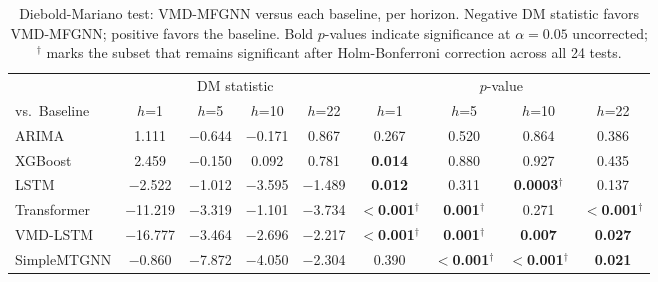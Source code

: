 \documentclass[journal]{IEEEtran}
\begin{document}
\begin{table}[!t]
\centering
\caption{Diebold-Mariano test: VMD-MFGNN versus each baseline, per horizon. Negative DM statistic favors VMD-MFGNN; positive favors the baseline. Bold $p$-values indicate significance at $\alpha=0.05$ uncorrected; $^{\dagger}$ marks the subset that remains significant after Holm-Bonferroni correction across all 24 tests.}
\label{tab:dm}
\begin{tabular}{l cccc cccc}
\toprule
& \multicolumn{4}{c}{DM statistic} & \multicolumn{4}{c}{$p$-value} \\
\cmidrule(lr){2-5} \cmidrule(lr){6-9}
vs.\ Baseline & $h$=1 & $h$=5 & $h$=10 & $h$=22 & $h$=1 & $h$=5 & $h$=10 & $h$=22 \\
\midrule
ARIMA        & 1.111 & $-$0.644 & $-$0.171 & 0.867 & 0.267 & 0.520 & 0.864 & 0.386 \\
XGBoost      & 2.459 & $-$0.150 & 0.092 & 0.781 & \textbf{0.014} & 0.880 & 0.927 & 0.435 \\
LSTM         & $-$2.522 & $-$1.012 & $-$3.595 & $-$1.489 & \textbf{0.012} & 0.311 & \textbf{0.0003}$^{\dagger}$ & 0.137 \\
Transformer  & $-$11.219 & $-$3.319 & $-$1.101 & $-$3.734 & \textbf{$<$0.001}$^{\dagger}$ & \textbf{0.001}$^{\dagger}$ & 0.271 & \textbf{$<$0.001}$^{\dagger}$ \\
VMD-LSTM     & $-$16.777 & $-$3.464 & $-$2.696 & $-$2.217 & \textbf{$<$0.001}$^{\dagger}$ & \textbf{0.001}$^{\dagger}$ & \textbf{0.007} & \textbf{0.027} \\
SimpleMTGNN  & $-$0.860 & $-$7.872 & $-$4.050 & $-$2.304 & 0.390 & \textbf{$<$0.001}$^{\dagger}$ & \textbf{$<$0.001}$^{\dagger}$ & \textbf{0.021} \\
\bottomrule
\end{tabular}
\end{table}

\FloatBarrier
\end{document}
